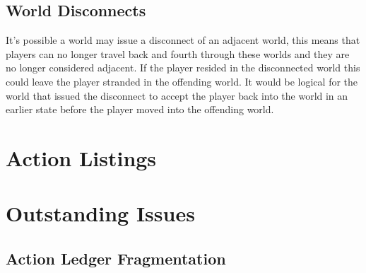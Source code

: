 \documentclass[runningheads,a4paper]{llncs}
\begin{document}
\subsection{World Disconnects}
\label{WD}
It's possible a world may issue a disconnect of an adjacent world, this means that players can no longer travel back and fourth through these worlds and they are no longer considered adjacent. If the player resided in the disconnected world this could leave the player stranded in the offending world. It would be logical for the world that issued the disconnect to accept the player back into the world in an earlier state before the player moved into the offending world.

\section{Action Listings}


\section{Outstanding Issues}
\subsection{Action Ledger Fragmentation}
\label{ALF}
\end{document}
